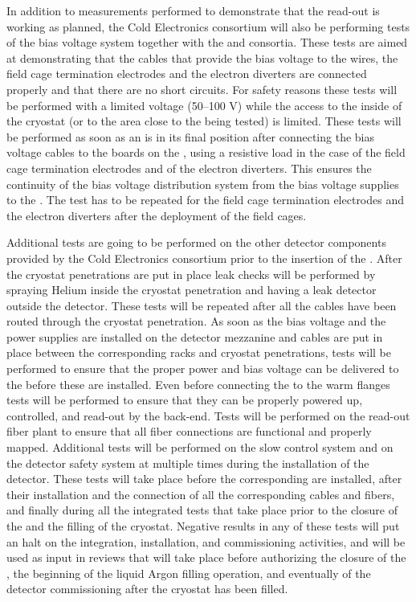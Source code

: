 In addition to measurements performed to demonstrate that the 
read-out is working as planned, the Cold Electronics consortium will also
be performing tests of the bias voltage system together with the 
and  consortia. These tests are aimed at demonstrating that
the cables that provide the bias voltage to the  wires, the
field cage termination electrodes and the electron diverters are connected
properly and that there are no short circuits. For safety reasons these
tests will be performed with a limited voltage (50--100 V) while the access
to the inside of the cryostat (or to the area close to the  being
tested) is limited. These tests will be performed as soon as an 
is in its final position after connecting the bias voltage cables to the 
 boards on the , using a resistive load in the case of the 
field cage termination electrodes and of the electron diverters. This ensures
the continuity of the bias voltage distribution system from the bias voltage
supplies to the . The test has to be repeated for the field cage
termination electrodes and the electron diverters after the deployment of
the field cages.

Additional tests are going to be performed on the other detector components
provided by the Cold Electronics consortium prior to the insertion of the
. After the cryostat penetrations are put in place leak checks
will be performed by spraying Helium inside the cryostat penetration and
having a leak detector outside the detector. These tests will be repeated 
after all the cables have been routed through the cryostat penetration.
As soon as the bias voltage and the power supplies are installed on the detector
mezzanine and cables are put in place between the corresponding racks and
cryostat penetrations, tests will be performed to ensure that the proper 
power and bias voltage can be delivered to the  before these
are installed. Even before connecting the  to the warm flanges
tests will be performed to ensure that they can be properly powered up, controlled,
and read-out by the  back-end. Tests will be performed on the
read-out fiber plant to ensure that all fiber connections are functional
and properly mapped. Additional tests will be performed on the slow control
system and on the detector safety system at multiple times during the
installation of the detector. These tests will take place before the
corresponding  are installed, after their installation and
the connection of all the corresponding cables and fibers, and finally
during all the integrated tests that take place prior to the closure of
the  and the filling of the cryostat. Negative results in any
of these tests will put an halt on the integration, installation, and
commissioning activities, and will be used as input in reviews that will
take place before authorizing the closure of the , the beginning
of the liquid Argon filling operation, and eventually of the detector 
commissioning after the cryostat has been filled.

